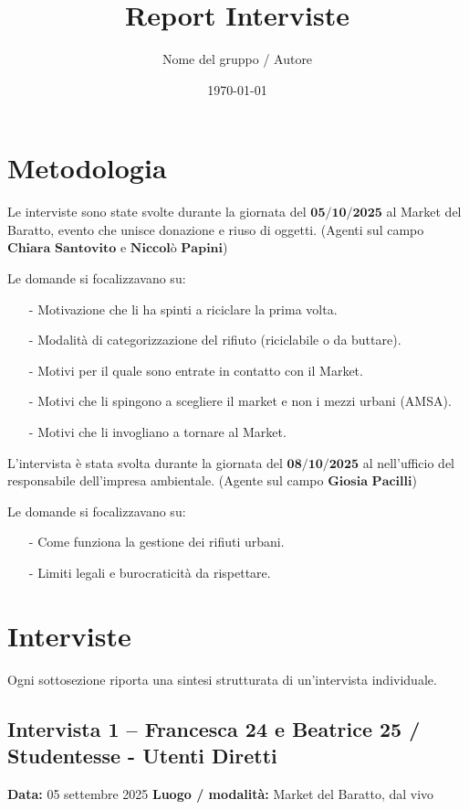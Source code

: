 \documentclass[12pt,a4paper]{article}
\title{Report Interviste}
\author{Nome del gruppo / Autore}
\date{\today}
\begin{document}
\maketitle
\tableofcontents
\newpage

\section{Metodologia}
Le interviste sono state svolte durante la giornata del $\textbf{05/10/2025}$ al Market del Baratto, evento che unisce donazione e riuso di oggetti. (Agenti sul campo $\textbf{Chiara Santovito}$ e $\textbf{Niccolò Papini}$) 

Le domande si focalizzavano su:
\begin{itemize}
  \item [-] Motivazione che li ha spinti a riciclare la prima volta.
  \item [-] Modalità di categorizzazione del rifiuto (riciclabile o da buttare).
  \item [-] Motivi per il quale sono entrate in contatto con il Market.
  \item [-] Motivi che li spingono a scegliere il market e non i mezzi urbani (AMSA).
  \item [-] Motivi che li invogliano a tornare al Market.
\end{itemize}

L'intervista è stata svolta durante la giornata del $\textbf{08/10/2025}$ al nell'ufficio del responsabile dell'impresa ambientale. (Agente sul campo $\textbf{Giosia Pacilli}$) 

Le domande si focalizzavano su:
\begin{itemize}
  \item [-] Come funziona la gestione dei rifiuti urbani.
  \item [-] Limiti legali e burocraticità da rispettare.
\end{itemize}

\newpage


\section{Interviste}
Ogni sottosezione riporta una sintesi strutturata di un'intervista individuale.

\subsection{Intervista 1 – Francesca 24 e Beatrice 25 / Studentesse - Utenti Diretti}
\textbf{Data:} 05 settembre 2025  
\textbf{Luogo / modalità:} Market del Baratto, dal vivo  
\end{document}
